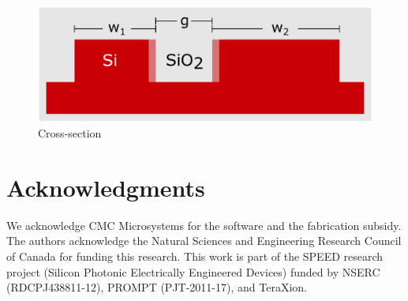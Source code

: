 \documentclass[letterpaper,10pt]{article}
\begin{document}
\begin{figure}[htbp]
	\centering
	\includegraphics[width=.99\columnwidth]{CrossSection}
	\caption{Cross-section}
	\label{fig:bandTuneSimu}
\end{figure} 

















\section*{Acknowledgments}
We acknowledge CMC Microsystems for the  software and the fabrication subsidy. The authors acknowledge the Natural Sciences and Engineering Research Council of Canada for funding this research. This work is part of the SPEED research project (Silicon Photonic Electrically Engineered Devices) funded by NSERC (RDCPJ438811-12), PROMPT (PJT-2011-17), and TeraXion.



\end{document}
